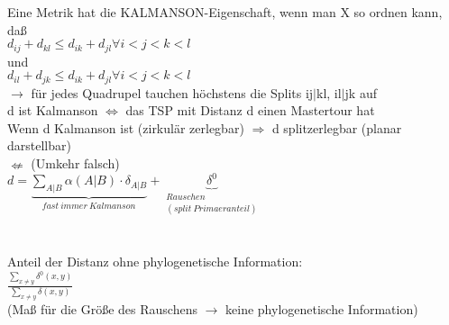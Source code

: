 \documentclass[12pt,a4paper]{article}
\begin{document}
Eine Metrik hat die KALMANSON-Eigenschaft, wenn man X so ordnen kann, daß\\
$d_{ij}+d_{kl}\leq d_{ik} + d_{jl} \forall i<j<k<l$\\
und\\
$d_{il}+d_{jk}\leq d_{ik} + d_{jl} \forall i<j<k<l$\\
$\rightarrow$ für jedes Quadrupel tauchen höchstens die Splits ij$|$kl, il$|$jk auf\\
d ist Kalmanson $\Leftrightarrow$ das TSP mit Distanz d einen Mastertour hat\\
Wenn d Kalmanson ist (zirkulär zerlegbar) $\Rightarrow$ d splitzerlegbar (planar darstellbar)\\
$\nLeftarrow$ (Umkehr falsch)\\

$d=\underbrace{\displaystyle\sum_{A|B}\alpha(A|B) \cdot \delta_{A|B}}_{fast\ immer\ Kalmanson} + \underbrace{\delta^0}_{\substack{Rauschen \\ (split\ Primaeranteil)}}$\\\\\\
Anteil der Distanz ohne phylogenetische Information:\\
$\frac{\displaystyle\sum_{x\neq y} \delta^0(x,y)}{\displaystyle\sum_{x\neq y} \delta(x,y)}$\\
(Maß für die Größe des Rauschens $\rightarrow$ keine phylogenetische Information)
\end{document}

